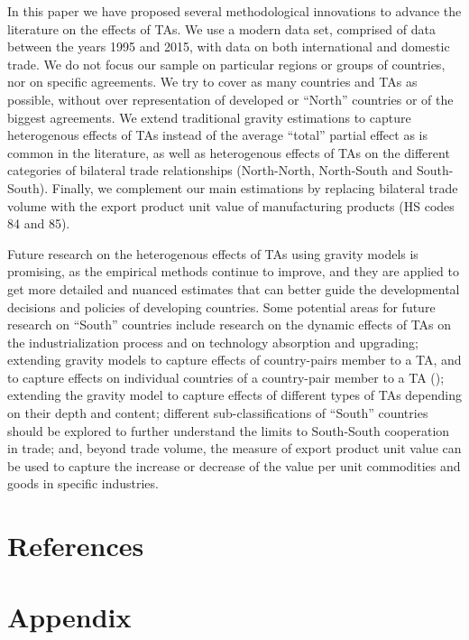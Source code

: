 In this paper we have proposed several methodological innovations to
advance the literature on the effects of TAs. We use a modern data set,
comprised of data between the years 1995 and 2015, with data on both
international and domestic trade. We do not focus our sample on
particular regions or groups of countries, nor on specific agreements.
We try to cover as many countries and TAs as possible, without over
representation of developed or ``North'' countries or of the biggest
agreements. We extend traditional gravity estimations to capture
heterogenous effects of TAs instead of the average ``total'' partial
effect as is common in the literature, as well as heterogenous effects
of TAs on the different categories of bilateral trade relationships
(North-North, North-South and South-South). Finally, we complement our
main estimations by replacing bilateral trade volume with the export
product unit value of manufacturing products (HS codes 84 and 85).

Future research on the heterogenous effects of TAs using gravity models
is promising, as the empirical methods continue to improve, and they are
applied to get more detailed and nuanced estimates that can better guide
the developmental decisions and policies of developing countries. Some
potential areas for future research on ``South'' countries include
research on the dynamic effects of TAs on the industrialization process
and on technology absorption and upgrading; extending gravity models to
capture effects of country-pairs member to a TA, and to capture effects
on individual countries of a country-pair member to a TA (\cite{baier_widely_2019}); extending the gravity model to capture effects of different types
of TAs depending on their depth and content; different
sub-classifications of ``South'' countries should be explored to further
understand the limits to South-South cooperation in trade; and, beyond
trade volume, the measure of export product unit value can be used to
capture the increase or decrease of the value per unit commodities and
goods in specific industries.

%
\newpage%
\section{References}%
\label{sec:References}%
\printbibliography

%
\newpage%
\section{Appendix}%
\label{sec:Appendix}%
